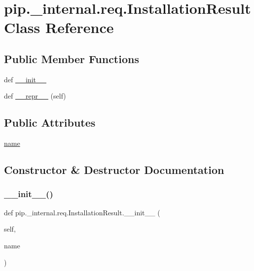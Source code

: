 \hypertarget{classpip_1_1__internal_1_1req_1_1InstallationResult}{}\section{pip.\+\_\+internal.\+req.\+Installation\+Result Class Reference}
\label{classpip_1_1__internal_1_1req_1_1InstallationResult}
\subsection*{Public Member Functions}
\begin{DoxyCompactItemize}
\item 
def \hyperlink{classpip_1_1__internal_1_1req_1_1InstallationResult_a4b02629eee50af086ad722d32874932a}{\+\_\+\+\_\+init\+\_\+\+\_\+}
\item 
def \hyperlink{classpip_1_1__internal_1_1req_1_1InstallationResult_ac66046471d3e4e7060fae5edbd221596}{\+\_\+\+\_\+repr\+\_\+\+\_\+} (self)
\end{DoxyCompactItemize}
\subsection*{Public Attributes}
\begin{DoxyCompactItemize}
\item 
\hyperlink{classpip_1_1__internal_1_1req_1_1InstallationResult_a4a9f7145ab823aff954f975983ac730f}{name}
\end{DoxyCompactItemize}


\subsection{Constructor \& Destructor Documentation}
\mbox{\label{classpip_1_1__internal_1_1req_1_1InstallationResult_a4b02629eee50af086ad722d32874932a}} 
\subsubsection{\texorpdfstring{\+\_\+\+\_\+init\+\_\+\+\_\+()}{\_\_init\_\_()}}
{\footnotesize\ttfamily def pip.\+\_\+internal.\+req.\+Installation\+Result.\+\_\+\+\_\+init\+\_\+\+\_\+ (\begin{DoxyParamCaption}\item[{}]{self,  }\item[{}]{name }\end{DoxyParamCaption})}



